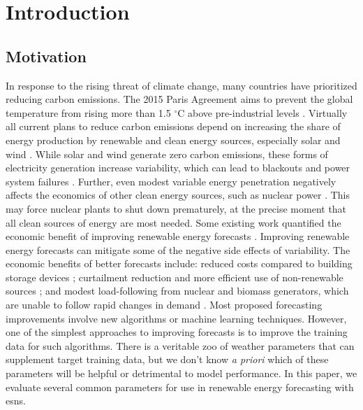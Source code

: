\section{Introduction}
\subsection{Motivation}
In response to the rising threat of climate change, many countries have
prioritized reducing carbon emissions. The 2015 Paris
Agreement aims to prevent the global temperature from rising more than 1.5
$^\circ$C above pre-industrial levels \cite{noauthor_paris_nodate}. Virtually
all current plans to reduce carbon emissions depend on increasing the share of
energy production by renewable and clean energy sources, especially solar and
wind \cite{cany_nuclear_2018, chilvers_realising_2017,99th_general_assembly_illinois_2016,isee_illinois_2015}.
 While solar and wind generate zero carbon emissions, these
forms of electricity generation increase variability, which can lead to
blackouts and power system failures
\cite{haes_alhelou_survey_2019}. Further, even modest variable energy
penetration negatively affects the economics of other clean energy sources,
such as nuclear power
\cite{cany_nuclear_2018,keppler_carbon_2011,illinois_commerce_commision_icc_potential_2015}. This may force nuclear plants to shut down prematurely, at the
precise moment that all clean sources of energy are most needed. Some existing
work quantified the economic benefit of improving
renewable energy forecasts \cite{wang_quantifying_2016, mc_garrigle_quantifying_2015, brancucci_martinez-anido_value_2016}.
Improving renewable energy forecasts can
mitigate some of the negative side effects of variability. The economic
benefits of better  forecasts include: reduced costs compared to building
storage devices \cite{wang_quantifying_2016}; curtailment reduction and more
efficient use of non-renewable sources \cite{mc_garrigle_quantifying_2015}; and
modest load-following from nuclear and biomass
generators, which are unable to follow rapid changes in demand
\cite{brancucci_martinez-anido_value_2016}. Most proposed forecasting
improvements involve new algorithms or machine learning techniques. However,
one of the simplest approaches to improving forecasts is to improve the
training data for such algorithms. There is a veritable zoo of weather
parameters that can supplement target training data, but we don't know \textit{a
priori} which of these parameters will be helpful or detrimental to model
performance. In this paper, we evaluate several common parameters for use
in renewable energy forecasting with \glspl{esn}.


